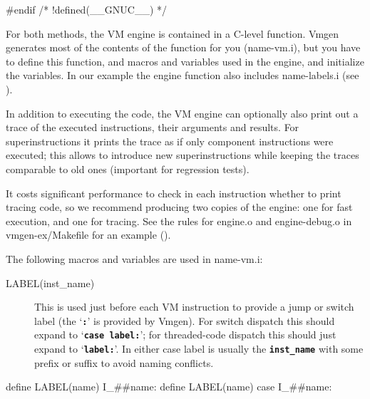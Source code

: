 \documentclass[10pt,english]{article}
\begin{document}
#endif /* !defined(__GNUC__) */
\nwendcode{}\nwdocspar

For both methods, the VM engine is contained in a C-level function.
Vmgen generates most of the contents of the function for you (name-vm.i),
but you have to define this function, and macros and variables used
in the engine, and initialize the variables. In our example the engine
function also includes name-labels.i (see ).

In addition to executing the code, the VM engine can optionally also
print out a trace of the executed instructions, their arguments and
results. For superinstructions it prints the trace as if only component
instructions were executed; this allows to introduce new superinstructions
while keeping the traces comparable to old ones (important for regression
tests).

It costs significant performance to check in each instruction whether
to print tracing code, so we recommend producing two copies of the
engine: one for fast execution, and one for tracing. See the rules
for engine.o and engine-debug.o in vmgen-ex/Makefile for an example
().

The following macros and variables are used in name-vm.i:
\begin{description}
\item [{LABEL(inst\_name)}] This is used just before each VM instruction
to provide a jump or switch label (the \textquoteleft{}\texttt{\textbf{:}}\textquoteright{}
is provided by Vmgen). For switch dispatch this should expand to \textquoteleft{}\texttt{\textbf{case
label:}}\textquoteright{}; for threaded-code dispatch this should
just expand to \textquoteleft{}\texttt{\textbf{label:}}\textquoteright{}.
In either case label is usually the \texttt{\textbf{inst\_name}} with
some prefix or suffix to avoid naming conflicts.
\end{description}
\nwenddocs{}\endmoddef
define LABEL(name) I_##name:
\nwendcode{}\nwdocspar
\nwenddocs{}\endmoddef
define LABEL(name) case I_##name:
\nwendcode{}\nwdocspar
\end{document}
